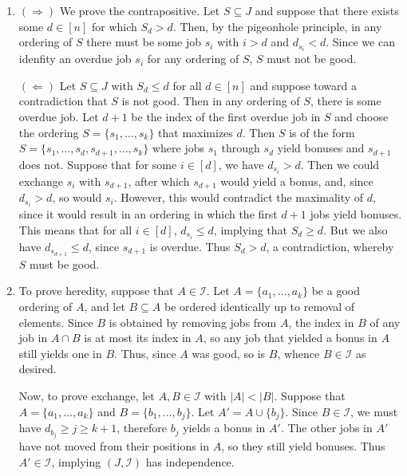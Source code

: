 \documentclass[11pt]{article}
\newcommand{\I}{\mathcal{I}}
\begin{document}
\begin{enumerate}[\indent (1)]
    \item $(\Rightarrow)$ We prove the contrapositive.
      Let $S \subseteq J$ and suppose that there exists some $d \in [n]$ for which $S_d > d$.
      Then, by the pigeonhole principle, in any ordering of $S$ there must be some job $s_i$ with $i > d$ and $d_{s_i} < d$.
      Since we can idenfity an overdue job $s_i$ for any ordering of $S$, $S$ must not be good.

      $(\Leftarrow)$ Let $S \subseteq J$ with $S_d \leq d$ for all $d \in [n]$ and suppose toward a contradiction that $S$ is not good.
      Then in any ordering of $S$, there is some overdue job.
      Let $d + 1$ be the index of the first overdue job in $S$ and choose the ordering $S = \{s_1, \dots, s_k\}$ that maximizes $d$.
      Then $S$ is of the form $S = \{s_1, \dots, s_d, s_{d+1}, \dots, s_k\}$ where jobs $s_1$ through $s_{d}$ yield bonuses and $s_{d+1}$ does not.
      Suppose that for some $i \in [d]$, we have $d_{s_i} > d$.
      Then we could exchange $s_i$ with $s_{d+1}$, after which $s_{d+1}$ would yield a bonus, and, since $d_{s_i} > d$, so would $s_i$.
      However, this would contradict the maximality of $d$, since it would result in an ordering in which the first $d+1$ jobs yield bonuses.
      This means that for all $i \in [d]$, $d_{s_i} \leq d$, implying that $S_d \geq d$.
      But we also have $d_{s_{d+1}} \leq d$, since $s_{d+1}$ is overdue.
      Thus $S_d > d$, a contradiction, whereby $S$ must be good.

    \item To prove heredity, suppose that $A \in \I$.
      Let $A = \{a_1, \dots, a_k\}$ be a good ordering of $A$, and let $B \subseteq A$ be ordered identically up to removal of elements.
      Since $B$ is obtained by removing jobs from $A$, the index in $B$ of any job in $A \cap B$ is at most its index in $A$, so any job that yielded a bonus in $A$ still yields one in $B$.
      Thus, since $A$ was good, so is $B$, whence $B \in \I$ as desired.

      Now, to prove exchange, let $A, B \in \I$ with $|A| < |B|$.
      Suppose that $A = \{a_1, \dots, a_k\}$ and $B = \{b_1, \dots, b_j\}$.
      Let $A' = A \cup \{b_j\}$.
      Since $B \in \I$, we must have $d_{b_j} \geq j \geq k + 1$, therefore $b_j$ yields a bonus in $A'$.
      The other jobs in $A'$ have not moved from their positions in $A$, so they still yield bonuses.
      Thus $A' \in \I$, implying $(J, \I)$ has independence.


\end{enumerate}
\end{document}
